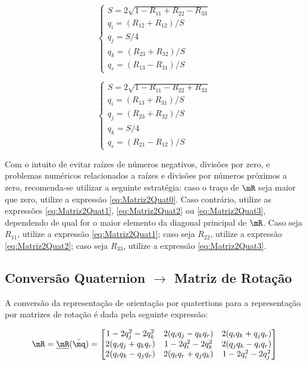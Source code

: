 \documentclass[]{politex}
\begin{document}
\begin{equation} \label{eq:Matriz2Quat2}
\begin{cases}
S = 2 \sqrt{1 - R_{11} + R_{22} - R_{33}} \\
q_i = (R_{12} + R_{12})/S \\
q_j = S/4 \\
q_k = (R_{23} + R_{32})/S \\
q_r = (R_{13} - R_{31})/S
\end{cases}
\end{equation}

\begin{equation} \label{eq:Matriz2Quat3}
\begin{cases} 
S = 2 \sqrt{1 - R_{11} - R_{22} + R_{33}} \\
q_i = (R_{13} + R_{31})/S \\
q_j = (R_{23} + R_{32})/S \\
q_k = S/4 \\
q_r = (R_{21} - R_{12})/S
\end{cases}
\end{equation}

Com o intuito de evitar raízes de números negativos, divisões por zero, e problemas numéricos relacionados a raízes e divisões por números próximos a zero, recomenda-se utilizar a seguinte estratégia: caso o traço de $\mR$ seja maior que zero, utilize a expressão \eqref{eq:Matriz2Quat0}. Caso contrário, utilize as expressões \eqref{eq:Matriz2Quat1}, \eqref{eq:Matriz2Quat2} ou \eqref{eq:Matriz2Quat3}, dependendo de qual for o maior elemento da diagonal principal de $\mR$. Caso  seja $R_{11}$, utilize a expressão \eqref{eq:Matriz2Quat1}; caso seja $R_{22}$, utilize a expressão \eqref{eq:Matriz2Quat2}; caso seja $R_{33}$, utilize a expressão \eqref{eq:Matriz2Quat3}.

\subsection{Conversão Quaternion $\rightarrow$ Matriz de Rotação}

A conversão da representação de orientação por quatertions para a representação por matrizes de rotação é dada pela seguinte expressão:

\begin{equation} \label{eq:Quat2Matriz}
\mR = \underline{\mR}(\breve{\mq}) = \begin{bmatrix}
1 - 2 q_j^2 - 2 q_k^2 & 2(q_i q_j - q_k q_r) & 2(q_i q_k + q_j q_r) \\
2(q_i q_j + q_k q_r) & 1 - 2 q_i^2 - 2q_k^2 & 2(q_j q_k - q_i q_r) \\
2(q_i q_k - q_j q_r) & 2(q_i q_r + q_j q_k) & 1 - 2 q_i^2 - 2 q_j^2
\end{bmatrix}
\end{equation}
\end{document}
